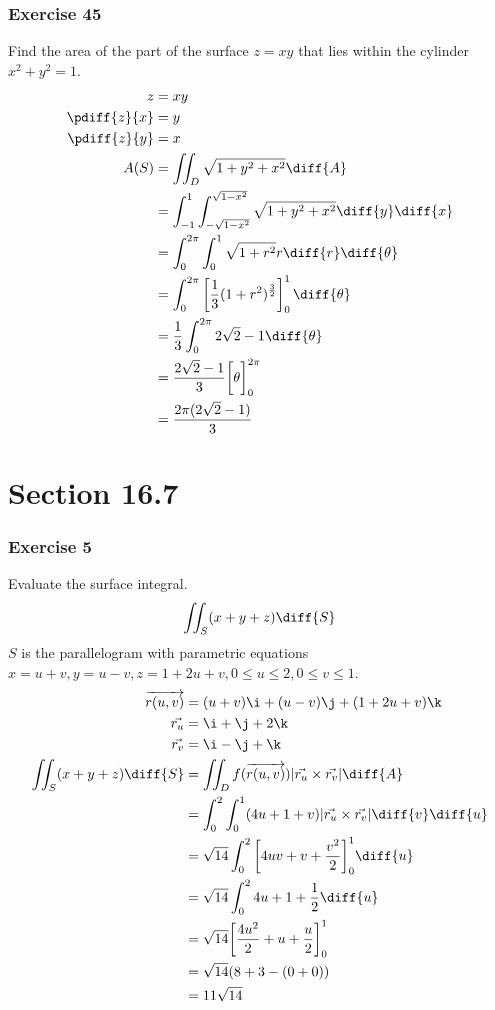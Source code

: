 \documentclass{math}
\begin{document}
\subsubsection*{Exercise 45}
Find the area of the part of the surface \( z = xy \) that lies within the
cylinder \( x^2+y^2 = 1 \).
\begin{align*}
  z &= xy \\
  \pdiff{z}{x} &= y \\
  \pdiff{z}{y} &= x \\
  A(S) &= \iint_{D}\sqrt{1+y^2+x^2}\diff{A} \\
  &= \int_{-1}^{1}\int_{-\sqrt{1-x^2}}^{\sqrt{1-x^2}}\sqrt{1+y^2+x^2}
    \diff{y}\diff{x} \\
  &= \int_{0}^{2\pi}\int_{0}^{1}\sqrt{1+r^2}r\diff{r}\diff{\theta} \\
  &= \int_{0}^{2\pi}\left[\frac{1}{3}(1+r^2)^{\frac{3}{2}}\right]_{0}^{1}
    \diff{\theta} \\
  &= \frac{1}{3}\int_{0}^{2\pi}2\sqrt{2}-1\diff{\theta} \\
  &= \frac{2\sqrt{2}-1}{3}\bigg[\theta\bigg]_{0}^{2\pi} \\
  &= \frac{2\pi(2\sqrt{2}-1)}{3}
\end{align*}

\section*{Section 16.7}

\subsubsection*{Exercise 5}
Evaluate the surface integral.
\[ \iint_{S}(x+y+z)\diff{S} \]
\( S \) is the parallelogram with parametric equations \( x = u+v, y = u-v,
z = 1+2u+v, 0\le u\le 2, 0\le v\le 1 \).
\begin{align*}
  \overrightarrow{r(u,v)} &= (u+v)\i+(u-v)\j+(1+2u+v)\k \\
  \vec{r_u} &= \i+\j+2\k \\
  \vec{r_v} &= \i-\j+\k \\
  \iint_{S}(x+y+z)\diff{S} &=
    \iint_{D}f(\overrightarrow{r(u,v)})|\vec{r_u}\times\vec{r_v}|\diff{A} \\
  &= \int_{0}^{2}\int_{0}^{1}(4u+1+v)|\vec{r_u}\times\vec{r_v}|
    \diff{v}\diff{u} \\
  &= \sqrt{14}\int_{0}^{2}\bigg[4uv+v+\frac{v^2}{2}\bigg]_{0}^{1}\diff{u} \\
  &= \sqrt{14}\int_{0}^{2}4u+1+\frac{1}{2}\diff{u} \\
  &= \sqrt{14}\bigg[\frac{4u^2}{2}+u+\frac{u}{2}\bigg]_{0}^{1} \\
  &= \sqrt{14}(8+3-(0+0)) \\
  &= 11\sqrt{14}
\end{align*}
\end{document}
